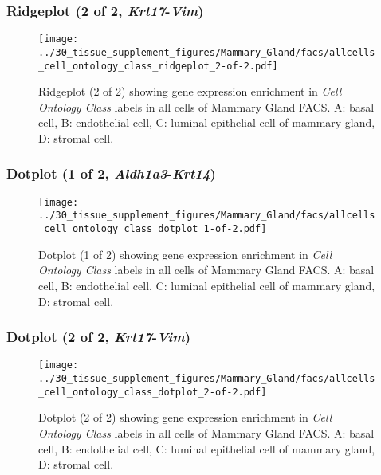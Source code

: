 \clearpage

\subsubsection{Ridgeplot (2 of 2, \emph{Krt17}-\emph{Vim})}
\begin{figure}[h]
\centering
\texttt{[image: ../30\_tissue\_supplement\_figures/Mammary\_Gland/facs/allcells\_cell\_ontology\_class\_ridgeplot\_2-of-2.pdf]}

\caption{ Ridgeplot (2 of 2)  showing gene expression enrichment in \emph{Cell Ontology Class} labels in all cells of Mammary Gland FACS. A: basal cell, B: endothelial cell, C: luminal epithelial cell of mammary gland, D: stromal cell.}
\end{figure}


\clearpage

\subsubsection{Dotplot (1 of 2, \emph{Aldh1a3}-\emph{Krt14})}
\begin{figure}[h]
\centering
\texttt{[image: ../30\_tissue\_supplement\_figures/Mammary\_Gland/facs/allcells\_cell\_ontology\_class\_dotplot\_1-of-2.pdf]}

\caption{ Dotplot (1 of 2)  showing gene expression enrichment in \emph{Cell Ontology Class} labels in all cells of Mammary Gland FACS. A: basal cell, B: endothelial cell, C: luminal epithelial cell of mammary gland, D: stromal cell.}
\end{figure}


\clearpage

\subsubsection{Dotplot (2 of 2, \emph{Krt17}-\emph{Vim})}
\begin{figure}[h]
\centering
\texttt{[image: ../30\_tissue\_supplement\_figures/Mammary\_Gland/facs/allcells\_cell\_ontology\_class\_dotplot\_2-of-2.pdf]}

\caption{ Dotplot (2 of 2)  showing gene expression enrichment in \emph{Cell Ontology Class} labels in all cells of Mammary Gland FACS. A: basal cell, B: endothelial cell, C: luminal epithelial cell of mammary gland, D: stromal cell.}
\end{figure}


\clearpage

